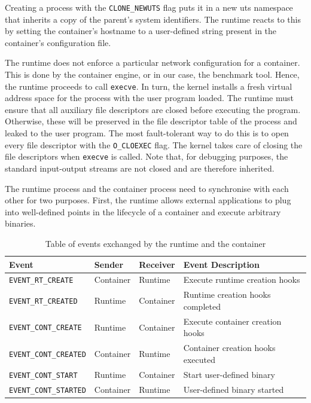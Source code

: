 Creating a process with the \verb|CLONE_NEWUTS| flag puts it in a new uts namespace that inherits 
a copy of the parent's system identifiers. The runtime reacts to this by setting the container's
hostname to a user-defined string present in the container's configuration file.

The runtime does not enforce a particular network configuration for a container. This is done 
by the container engine, or in our case, the benchmark tool. Hence, the runtime proceeds 
to call \verb|execve|. In turn, the kernel installs a fresh virtual address space 
for the process with the user program loaded. 
The runtime must ensure that all auxiliary file descriptors 
are closed before executing the program. Otherwise, these will be preserved in the file descriptor 
table of the process and leaked to the user program.
The most fault-tolerant way to do this is to open every file descriptor with the \verb|O_CLOEXEC|
flag. The kernel takes care of closing the file descriptors when \verb|execve| is called. 
Note that, for debugging purposes, the standard input-output streams are not closed and are 
therefore inherited. 

The runtime process and the container process need to synchronise with each other for two purposes.
First, the runtime allows external applications to plug into well-defined points in the 
lifecycle of a container and execute arbitrary binaries. 
\begin{table}[h!]
    \centering
    \begin{tabular}{ |m{4cm}|m{2cm}|m{2cm}|m{15em}| }
        \hline
        Event & Sender & Receiver & Event Description \\
        \hline
        \verb|EVENT_RT_CREATE| & Container & Runtime & Execute runtime creation hooks \\
        \hline
        \verb|EVENT_RT_CREATED| & Runtime & Container & Runtime creation hooks completed \\
        \hline 
        \verb|EVENT_CONT_CREATE| & Runtime & Container & Execute container creation hooks \\
        \hline 
        \verb|EVENT_CONT_CREATED| & Container & Runtime & Container creation hooks executed \\
        \hline
        \verb|EVENT_CONT_START| & Runtime & Container & Start user-defined binary \\
        \hline 
        \verb|EVENT_CONT_STARTED| & Container & Runtime & User-defined binary started \\
        \hline
    \end{tabular}
    \caption{Table of events exchanged by the runtime and the container}
    \label{table:implementation/runtime/socket-events}
\end{table}

